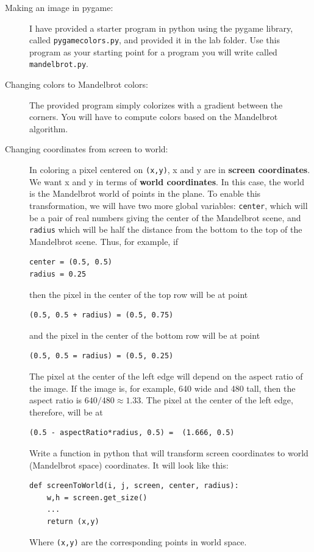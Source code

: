 \documentclass[12pt]{article}
\begin{document}
\begin{description}
\item[Making an image in pygame:]
I have provided a starter program in python
using the pygame library, called 
\lstinline{pygamecolors.py}, and provided
it in the lab folder.  Use this program
as your starting point for 
a program you will write called \lstinline{mandelbrot.py}.

\item[Changing colors to Mandelbrot colors:]
The provided program simply colorizes with a gradient
between the corners. You will have to compute
colors based on the Mandelbrot algorithm.

\item[Changing coordinates from screen to world:]
In coloring a pixel centered on \lstinline{(x,y)},
x and y are in {\bf screen coordinates}.  We
want x and y in terms of {\bf world coordinates}.
In this case, the world is the Mandelbrot
world of points in the plane.  To enable
this transformation, we will have two more
global variables: \lstinline{center}, which
will be a pair of real numbers giving the center
of the Mandelbrot scene, and \lstinline{radius}
which will be half the distance from 
the bottom to the top of the Mandelbrot scene.  Thus,
for example, if 
\begin{lstlisting}
center = (0.5, 0.5)
radius = 0.25
\end{lstlisting}
then the pixel in the center of the top row
will be at point 
\begin{lstlisting}
(0.5, 0.5 + radius) = (0.5, 0.75)
\end{lstlisting}
and the pixel in the center of the bottom
row will be at point 
\begin{lstlisting}
(0.5, 0.5 = radius) = (0.5, 0.25)
\end{lstlisting}

The pixel at the center of the left edge will
depend on the aspect ratio of the image.
If the image is, for example, 640 wide
and 480 tall, then the aspect ratio is
$640/480 \approx 1.33$.  The pixel at the
center of the left edge, therefore, will be
at 
\begin{lstlisting}
(0.5 - aspectRatio*radius, 0.5) =  (1.666, 0.5)
\end{lstlisting}
Write a function in python
that will transform screen coordinates to 
world (Mandelbrot space) coordinates.
It will look like this:
\begin{lstlisting}
def screenToWorld(i, j, screen, center, radius):
    w,h = screen.get_size()
    ...
    return (x,y)
\end{lstlisting}
Where \lstinline{(x,y)} are the corresponding
points in world space.


\end{description}
\end{document}
